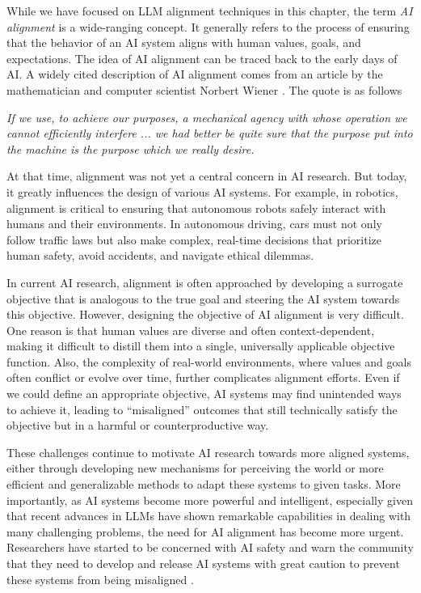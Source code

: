 While we have focused on LLM alignment techniques in this chapter, the term \textit{AI alignment} is a wide-ranging concept. It generally refers to the process of ensuring that the behavior of an AI system aligns with human values, goals, and expectations. The idea of AI alignment can be traced back to the early days of AI. A widely cited description of AI alignment comes from an article by the mathematician and computer scientist Norbert Wiener \cite{wiener:1960some}. The quote is as follows

\vspace{0.5em}
\begin{center}
\parbox{0.8\linewidth}{
\textit{If we use, to achieve our purposes, a mechanical agency with whose operation we cannot efficiently interfere ... we had better be quite sure that the purpose put into the machine is the purpose which we really desire.}
}
\end{center}
\vspace{0.5em}

At that time, alignment was not yet a central concern in AI research. But today, it greatly influences the design of various AI systems. For example, in robotics, alignment is critical to ensuring that autonomous robots safely interact with humans and their environments. In autonomous driving, cars must not only follow traffic laws but also make complex, real-time decisions that prioritize human safety, avoid accidents, and navigate ethical dilemmas.

In current AI research, alignment is often approached by developing a surrogate objective that is analogous to the true goal and steering the AI system towards this objective. However, designing the objective of AI alignment is very difficult. One reason is that human values are diverse and often context-dependent, making it difficult to distill them into a single, universally applicable objective function. Also, the complexity of real-world environments, where values and goals often conflict or evolve over time, further complicates alignment efforts. Even if we could define an appropriate objective, AI systems may find unintended ways to achieve it, leading to ``misaligned'' outcomes that still technically satisfy the objective but in a harmful or counterproductive way.

These challenges continue to motivate AI research towards more aligned systems, either through developing new mechanisms for perceiving the world or more efficient and generalizable methods to adapt these systems to given tasks. More importantly, as AI systems become more powerful and intelligent, especially given that recent advances in LLMs have shown remarkable capabilities in dealing with many challenging problems, the need for AI alignment has become more urgent. Researchers have started to be concerned with AI safety and warn the community that they need to develop and release AI systems with great caution to prevent these systems from being misaligned \cite{russell:2019human,bengio-etal:2024managing}.


